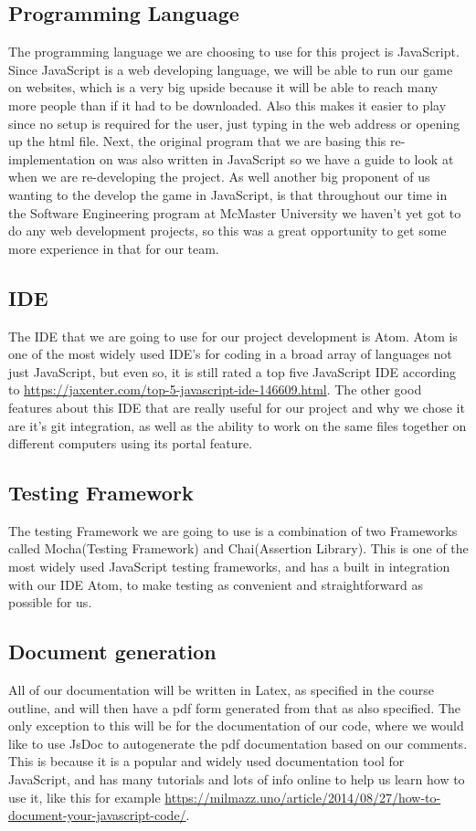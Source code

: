 \documentclass{article}
\begin{document}
\subsection{Programming Language}
The programming language we are choosing to use for this project is JavaScript. Since JavaScript is a web developing language, we will be able to run our game on websites, which is a very big upside because it will be able to reach many more people than if it had to be downloaded. Also this makes it easier to play since no setup is required for the user, just typing in the web address or opening up the html file. Next, the original program that we are basing this re-implementation on was also written in JavaScript so we have a guide to look at when we are re-developing the project. As well another big proponent of us wanting to the develop the game in JavaScript, is that throughout our time in the Software Engineering program at McMaster University we haven’t yet got to do any web development projects, so this was a great opportunity to get some more experience in that for our team.
\subsection{IDE}
The IDE that we are going to use for our project development is Atom. Atom is one of the most widely used IDE’s for coding in a broad array of languages not just JavaScript, but even so, it is still rated a top five JavaScript IDE according to \url{https://jaxenter.com/top-5-javascript-ide-146609.html}. The other good features about this IDE that are really useful for our project and why we chose it are it’s git integration, as well as the ability to work on the same files together on different computers using its portal feature.
\subsection{Testing Framework}
The testing Framework we are going to use is a combination of two Frameworks called Mocha(Testing Framework) and Chai(Assertion Library). This is one of the most widely used JavaScript testing frameworks, and has a built in integration with our IDE Atom, to make testing as convenient and straightforward as possible for us.
\subsection{Document generation}
All of our documentation will be written in Latex, as specified in the course outline, and will then have a pdf form generated from that as also specified. The only exception to this will be for the documentation of our code, where we would like to use JsDoc to autogenerate the pdf documentation based on our comments. This is because it is a popular and widely used documentation tool for JavaScript, and has many tutorials and lots of info online to help us learn how to use it, like this for example \url{https://milmazz.uno/article/2014/08/27/how-to-document-your-javascript-code/}.
\end{document}
